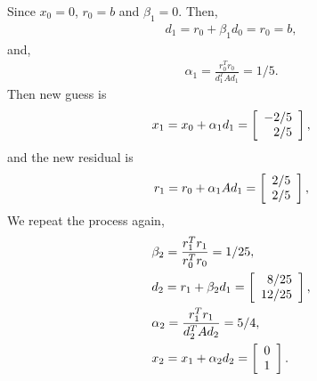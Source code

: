 \begin{questions}

\begin{solution}
Since $x_0=0$, $r_0=b$ and $\beta_1=0$. Then,
\begin{align*}
d_1=r_0+\beta_1d_0=r_0=b,
\end{align*}
and,
\begin{align*}
\alpha_1=\frac{r_0^Tr_0}{d_1^TAd_1}=1/5.
\end{align*}
Then new guess is
\begin{align*}
x_1=x_0+\alpha_1d_1=\left[
	\begin{array}{r r} 
	-2/5 \\
	2/5 \\
	\end{array} \right],
\end{align*}
and the new residual is
\begin{align*}
r_1=r_0+\alpha_1Ad_1=\left[
	\begin{array}{r r} 
	2/5 \\
	2/5 \\
	\end{array} \right],
\end{align*}
We repeat the process again,
\begin{align*}
&\beta_2=\frac{r_1^Tr_1}{r_0^Tr_0}=1/25,\\
&d_2=r_1+\beta_2d_1=\left[
	\begin{array}{r r} 
	8/25 \\
	12/25 \\
	\end{array} \right],\\
&\alpha_2=\frac{r_1^Tr_1}{d_2^TAd_2}=5/4,\\
&x_2=x_1+\alpha_2d_2=\left[
	\begin{array}{r r} 
	0 \\
	1 \\
	\end{array} \right].\\		
\end{align*}
\end{solution}
\end{questions}

